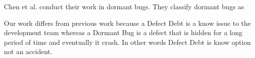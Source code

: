 Chen et al. \cite{Chen2014MSR} conduct their work in dormant bugs. They classify dormant bugs as 

Our work differs from previous work because a Defect Debt is a know issue to the development team whereas a Dormant Bug is a defect that is hidden for a long period of time and eventually it crash. In other words Defect Debt is know option not an accident.